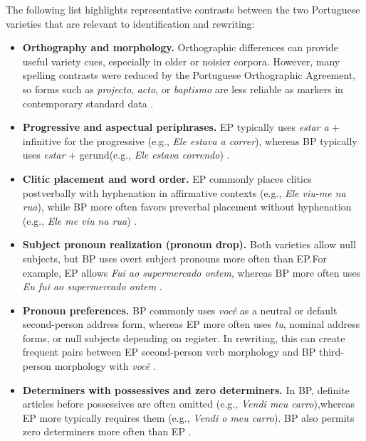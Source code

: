 The following list highlights representative contrasts between the two
Portuguese varieties that are relevant to identification and rewriting:

\begin{itemize}
\item \textbf{Orthography and morphology.} Orthographic differences can provide
useful variety cues, especially in older or noisier corpora. However, many
spelling contrasts were reduced by the Portuguese Orthographic Agreement, so
forms such as \textit{projecto}, \textit{acto}, or \textit{baptismo} are less
reliable as markers in contemporary standard data \citep{costa-jussa-etal-2018-neural}.

\item \textbf{Progressive and aspectual periphrases.} EP typically uses \textit{estar a} + infinitive for the progressive (e.g.,
\textit{Ele estava a correr}), whereas BP typically uses \textit{estar} +
gerund\hfil\break (e.g., \textit{Ele estava correndo})
\citep{barreiro-mota-2018-paraphrastic}.

\item \textbf{Clitic placement and word order.} EP commonly places clitics
postverbally with hyphenation in affirmative contexts (e.g., \textit{Ele
viu-me na rua}), while BP more often favors preverbal placement without
hyphenation (e.g., \textit{Ele me viu na rua})
\citep{barreiro-mota-2018-paraphrastic}.

\item { \textbf{Subject pronoun realization (pronoun drop).} Both varieties allow null subjects, but BP uses overt subject pronouns more often than EP.\hfil\break For example, EP allows \textit{Fui ao supermercado ontem},
whereas BP more often uses \textit{Eu fui ao supermercado ontem}
\citep{barreiro-mota-2018-paraphrastic, costa-jussa-etal-2018-neural}.\par}

\item \textbf{Pronoun preferences.} BP commonly uses \textit{você} as a
neutral or default second-person address form, whereas EP more often uses
\textit{tu}, nominal address forms, or null subjects depending on register. In
rewriting, this can create frequent pairs between EP second-person verb
morphology and BP third-person morphology with \textit{você}
\citep{barreiro-mota-2018-paraphrastic, costa-jussa-etal-2018-neural}.

\item \textbf{Determiners with possessives and zero determiners.} In BP,
definite articles before possessives are often omitted (e.g., \textit{Vendi
meu carro}),\hfil\break whereas EP more typically requires them (e.g., \textit{Vendi o meu
carro}). BP also permits zero determiners more often than EP \citep{barreiro-mota-2018-paraphrastic, Cyrino_2001}.


\end{itemize}
